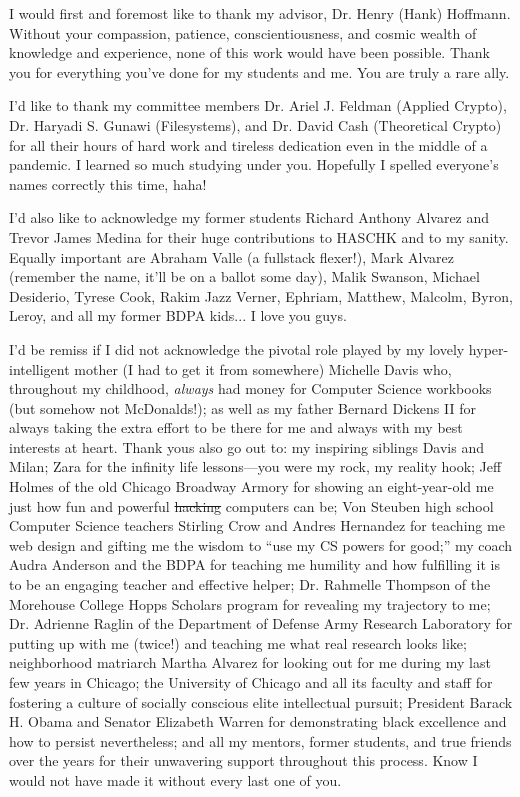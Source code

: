\acknowledgments
I would first and foremost like to thank my advisor, Dr. Henry (Hank) Hoffmann.
Without your compassion, patience, conscientiousness, and cosmic wealth of
knowledge and experience, none of this work would have been possible. Thank you
for everything you've done for my students and me. You are truly a rare ally.

I'd like to thank my committee members Dr. Ariel J. Feldman (Applied Crypto),
Dr. Haryadi S. Gunawi (Filesystems), and Dr. David Cash (Theoretical Crypto) for
all their hours of hard work and tireless dedication even in the middle of a
pandemic. I learned so much studying under you. Hopefully I spelled everyone's
names correctly this time, haha!

I'd also like to acknowledge my former students Richard Anthony Alvarez and
Trevor James Medina for their huge contributions to HASCHK and to my sanity.
Equally important are Abraham Valle (a fullstack flexer!), Mark Alvarez
(remember the name, it'll be on a ballot some day), Malik Swanson, Michael
Desiderio, Tyrese Cook, Rakim Jazz Verner, Ephriam, Matthew, Malcolm, Byron,
Leroy, and all my former BDPA kids... I love you guys.

I'd be remiss if I did not acknowledge the pivotal role played by my lovely
hyper-intelligent mother (I had to get it from somewhere) Michelle Davis who,
throughout my childhood, \emph{always} had money for Computer Science workbooks
(but somehow not McDonalds!); as well as my father Bernard Dickens II for always
taking the extra effort to be there for me and always with my best interests at
heart. Thank yous also go out to: my inspiring siblings Davis and Milan; Zara
for the infinity life lessons---you were my rock, my reality hook; Jeff Holmes
of the old Chicago Broadway Armory for showing an eight-year-old me just how fun
and powerful \sout{hacking} computers can be; Von Steuben high school Computer
Science teachers Stirling Crow and Andres Hernandez for teaching me web design
and gifting me the wisdom to ``use my CS powers for good;'' my coach Audra
Anderson and the BDPA for teaching me humility and how fulfilling it is to be an
engaging teacher and effective helper; Dr. Rahmelle Thompson of the Morehouse
College Hopps Scholars program for revealing my trajectory to me; Dr. Adrienne
Raglin of the Department of Defense Army Research Laboratory for putting up with
me (twice!) and teaching me what real research looks like; neighborhood
matriarch Martha Alvarez for looking out for me during my last few years in
Chicago; the University of Chicago and all its faculty and staff for fostering a
culture of socially conscious elite intellectual pursuit; President Barack H.
Obama and Senator Elizabeth Warren for demonstrating black excellence and how to
persist nevertheless; and all my mentors, former students, and true friends over
the years for their unwavering support throughout this process. Know I would not
have made it without every last one of you.

